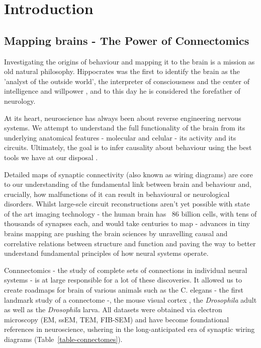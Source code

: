 
\chapter{Introduction}  


\section{Mapping brains - The Power of Connectomics} 
\label{Mapping Brains}

Investigating the origins of behaviour and mapping it to the brain is a mission as old natural philosophy. Hippocrates was the first to identify the brain as the 'analyst of the outside world', the interpreter of consciousness and the center of intelligence and willpower \citep{breitenfeld2014hippocrates}, and to this day he is considered the forefather of neurology.

At its heart, neuroscience has always been about reverse engineering nervous systems. 
We attempt to understand the full functionality of the brain from its underlying anatomical features - molecular and celular -  its activity and its circuits. Ultimately, the goal is to infer causality about behaviour using the best tools we have at our disposal \citep{mckinstry2013connectome}.

Detailed maps of synaptic connectivity (also known as wiring diagrams) are core to our understanding of the fundamental link between brain and behaviour and, crucially, how malfunctions of it can result in behavioural or neurological disorders. Whilst large-scle circuit reconstructions aren't yet possible with state of the art imaging technology - the human brain has ~86 billion cells\cite{herculano2009human}, with tens of thousands of synapses each, and would take centuries to map -  advances in tiny brains mapping are pushing the brain sciences by unravelling causal and correlative relations between structure and function and paving the way to better understand fundamental principles of how neural systems operate. 

Connnectomics - the study of complete sets of connections in individual neural systems - is at large responsible for a lot of these discoveries. It allowed us to create roadmaps for brain of various animals such as the C. elegans - the first landmark study of a connectome \citep{brenner1974genetics} -, the mouse visual cortex \citep{microns2025functional}, the \textit{Drosophila} adult \citep{scheffer2020connectome} as well as the \textit{Drosophila} larva\citep{ohyama2015multilevel, berck2016wiring,larderet2017opticlobe,eichler2017complete, eschbach2021circuits, eschbach2020recurrent}. All datasets were obtained via electron microscopy (EM, ssEM, TEM, FIB-SEM) and have become foundational references in neuroscience, ushering in the long-anticipated era of synaptic wiring diagrams (Table~\ref{table-connectomes}).

